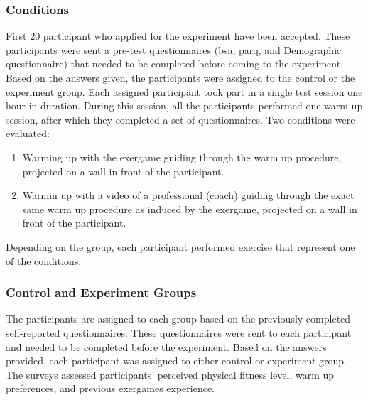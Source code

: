 \subsubsection{Conditions}
First 20 participant who applied for the experiment have been accepted. These participants were sent a pre-test questionnaires (\acrshort{bsa}, \acrshort{parq}, and Demographic questionnaire) that needed to be completed before coming to the experiment. Based on the answers given, the participants were assigned to the control or the experiment group. Each assigned participant took part in a single test session one hour in duration. During this session, all the participants  performed one warm up session, after which they completed a set of questionnaires. Two conditions were evaluated:
\begin{enumerate}
\item Warming up with the exergame guiding through the warm up procedure, projected on a wall in front of the participant.
\item Warmin up with a video of a professional (coach) guiding through the exact same warm up procedure as induced by the exergame, projected on a wall in front of the participant.
\end{enumerate}
Depending on the group, each participant performed exercise that represent one of the conditions.
\subsubsection{Control and Experiment Groups}
The participants are assigned to each group based on the previously completed self-reported questionnaires. These questionnaires were sent to each participant and needed to be completed before the experiment. Based on the answers provided, each participant was assigned to either control or experiment group. The surveys assessed participants' perceived physical fitness level, warm up preferences, and previous exergames experience.

